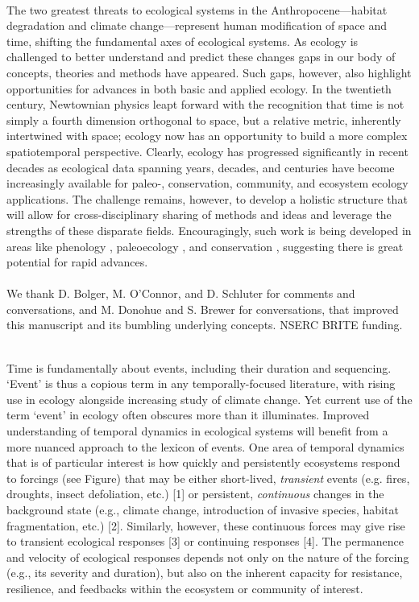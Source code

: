 \documentclass[11pt,a4paper,oneside]{article}
\begin{document}
\\

\noindent The two greatest threats to ecological systems in the Anthropocene---habitat degradation and climate change---represent human modification of space and time, shifting the fundamental axes of ecological systems. As ecology is challenged to better understand and predict these changes gaps in our body of concepts, theories and methods have appeared. Such gaps, however, also highlight opportunities for advances in both basic and applied ecology. In the twentieth century, Newtownian physics leapt forward with the recognition that time is not simply a fourth dimension orthogonal to space, but a relative metric, inherently intertwined with space; ecology now has an opportunity to build a more complex spatiotemporal perspective. Clearly, ecology has progressed significantly in recent decades as ecological data spanning years, decades, and centuries have become increasingly available for paleo-, conservation, community, and ecosystem ecology applications. The challenge remains, however, to develop a holistic structure that will allow for cross-disciplinary sharing of methods and ideas and leverage the strengths of these disparate fields. Encouragingly, such work is being developed in areas like phenology \citep{Pau:2011wd}, paleoecology \citep{Brewer2012}, and conservation \citep{mooers2008}, suggesting there is great potential for rapid advances. \\

\\
We thank D. Bolger, M. O'Connor, and D. Schluter for comments and conversations, and M. Donohue and S. Brewer for conversations, that improved this manuscript and its bumbling underlying concepts. NSERC BRITE funding. %


\newpage
{}\\
\noindent Time is fundamentally about events, including their duration and sequencing. `Event' is thus a copious term in any temporally-focused literature, with rising use in ecology alongside increasing study of climate change. Yet current use of the term `event' in ecology often obscures more than it illuminates. Improved understanding of temporal dynamics in ecological systems will benefit from a more nuanced approach to the lexicon of events. One area of temporal dynamics that is of particular interest is how quickly and persistently ecosystems respond to forcings (see Figure) that may be either short-lived, \emph{transient} events (e.g. fires, droughts, insect defoliation, etc.) [1] or persistent, \emph{continuous} changes in the background state (e.g., climate change, introduction of invasive species, habitat fragmentation, etc.) [2]. Similarly, however, these continuous forces may give rise to transient ecological responses [3] or continuing responses [4]. The permanence and velocity of ecological responses depends not only on the nature of the forcing (e.g., its severity and duration), but also on the inherent capacity for resistance, resilience, and feedbacks within the ecosystem or community of interest.\\
\end{document}
